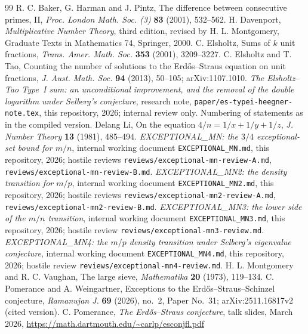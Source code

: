 \documentclass[10pt,reqno]{amsart}
\theoremstyle{definition}
\begin{document}
\begin{thebibliography}{99}
R. C. Baker, G. Harman and J. Pintz, The difference between consecutive
primes, II, \emph{Proc. London Math. Soc. (3)} \textbf{83} (2001),
532--562.
H. Davenport, \emph{Multiplicative Number Theory}, third edition,
revised by H. L. Montgomery, Graduate Texts in Mathematics 74,
Springer, 2000.
C. Elsholtz, Sums of $k$ unit fractions, \emph{Trans. Amer. Math. Soc.}
\textbf{353} (2001), 3209--3227.
C. Elsholtz and T. Tao, Counting the number of solutions to the
Erd\H{o}s--Straus equation on unit fractions, \emph{J. Aust. Math.
Soc.} \textbf{94} (2013), 50--105; arXiv:1107.1010.
\emph{The Elsholtz--Tao Type~I sum: an unconditional improvement, and the
removal of the double logarithm under Selberg's conjecture}, research
note, \texttt{paper/es-typei-heegner-note.tex}, this repository, 2026;
internal review only.  Numbering of statements as in the compiled
version.
Delang Li, On the equation $4/n=1/x+1/y+1/z$, \emph{J. Number Theory}
\textbf{13} (1981), 485--494.
\emph{EXCEPTIONAL\_MN: the $3/4$ exceptional-set bound for $m/n$},
internal working document \texttt{EXCEPTIONAL\_MN.md}, this repository,
2026; hostile reviews \texttt{reviews/exceptional-mn-review-A.md},
\texttt{reviews/exceptional-mn-review-B.md}.
\emph{EXCEPTIONAL\_MN2: the density transition for $m/p$},
internal working document \texttt{EXCEPTIONAL\_MN2.md}, this repository,
2026; hostile reviews \texttt{reviews/exceptional-mn2-review-A.md},
\texttt{reviews/exceptional-mn2-review-B.md}.
\emph{EXCEPTIONAL\_MN3: the lower side of the $m/n$ transition},
internal working document \texttt{EXCEPTIONAL\_MN3.md}, this repository,
2026; hostile review \texttt{reviews/exceptional-mn3-review.md}.
\emph{EXCEPTIONAL\_MN4: the $m/p$ density transition under Selberg's
eigenvalue conjecture}, internal working document
\texttt{EXCEPTIONAL\_MN4.md}, this repository, 2026; hostile review
\texttt{reviews/exceptional-mn4-review.md}.
H. L. Montgomery and R. C. Vaughan, The large sieve,
\emph{Mathematika} \textbf{20} (1973), 119--134.
C. Pomerance and A. Weingartner, Exceptions to the
Erd\H{o}s--Straus--Schinzel conjecture, \emph{Ramanujan J.} \textbf{69}
(2026), no.~2, Paper No.~31; arXiv:2511.16817v2 (cited version).
C. Pomerance, \emph{The Erd\H{o}s--Straus conjecture}, talk slides,
March 2026, \url{https://math.dartmouth.edu/~carlp/esconjfl.pdf}

\end{thebibliography}
\end{document}
